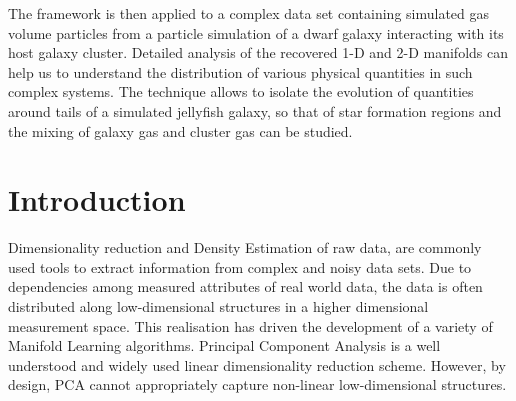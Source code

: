 {%
The framework is then applied to a complex data set containing simulated gas volume particles from a particle simulation of a dwarf galaxy interacting with its host galaxy cluster.
Detailed analysis of the recovered \mbox{1-D} and 2-D manifolds can help us to understand the distribution of various physical quantities in such complex systems.
The technique allows to isolate the evolution of quantities around tails of a simulated jellyfish galaxy, so that of star formation regions and the mixing of galaxy gas and cluster gas can be studied.
}
\section{Introduction}


Dimensionality reduction and Density Estimation of raw data, are commonly used tools to extract information from complex and noisy data sets.
Due to dependencies among measured attributes of real world data,
the data is often distributed along low-dimensional structures in a higher dimensional measurement space.
This realisation has driven the development of a variety of Manifold Learning algorithms.
Principal Component Analysis \citep[PCA, ][]{Pearson1901} is a well understood and widely used linear dimensionality reduction scheme.
However, by design, PCA cannot appropriately capture non-linear low-dimensional structures.



